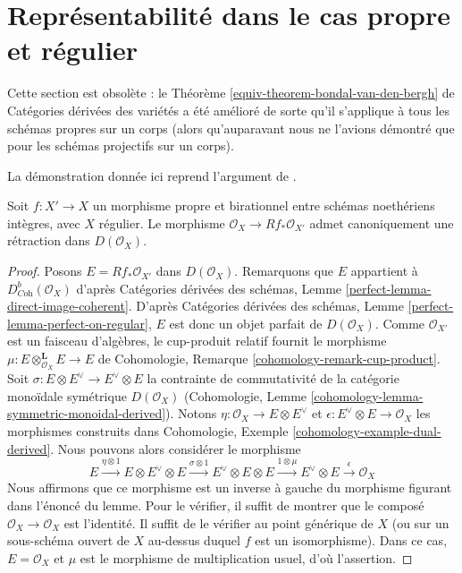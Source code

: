 \section{Représentabilité dans le cas propre et régulier}
\label{section-regular-proper}

\noindent
Cette section est obsolète : le Théorème
\ref{equiv-theorem-bondal-van-den-bergh} de Catégories dérivées des variétés
a été amélioré de sorte qu'il s'applique à tous les schémas propres sur un
corps (alors qu'auparavant nous ne l'avions démontré que pour les schémas
projectifs sur un corps).

\begin{lemma}
\label{lemma-trace-map}
\begin{reference}
La démonstration donnée ici reprend l'argument de
\cite[remarque 3.4]{MS}.
\end{reference}
Soit $f : X' \to X$ un morphisme propre et birationnel entre schémas
noethériens intègres, avec $X$ régulier. Le morphisme
$\mathcal{O}_X \to Rf_*\mathcal{O}_{X'}$ admet canoniquement une rétraction
dans $D(\mathcal{O}_X)$.
\end{lemma}

\begin{proof}
Posons $E = Rf_*\mathcal{O}_{X'}$ dans $D(\mathcal{O}_X)$.
Remarquons que $E$ appartient à
$D^b_{\textit{Coh}}(\mathcal{O}_X)$ d'après
Catégories dérivées des schémas, Lemme
\ref{perfect-lemma-direct-image-coherent}.
D'après Catégories dérivées des schémas, Lemme
\ref{perfect-lemma-perfect-on-regular}, $E$ est donc un objet parfait de
$D(\mathcal{O}_X)$. Comme $\mathcal{O}_{X'}$ est un faisceau d'algèbres,
le cup-produit relatif fournit le morphisme
$\mu : E \otimes_{\mathcal{O}_X}^\mathbf{L} E \to E$ de Cohomologie,
Remarque \ref{cohomology-remark-cup-product}.
Soit $\sigma : E \otimes E^\vee \to E^\vee \otimes E$ la contrainte de
commutativité de la catégorie monoïdale symétrique $D(\mathcal{O}_X)$
(Cohomologie, Lemme \ref{cohomology-lemma-symmetric-monoidal-derived}).
Notons $\eta : \mathcal{O}_X \to E \otimes E^\vee$ et
$\epsilon : E^\vee \otimes E \to \mathcal{O}_X$ les morphismes
construits dans Cohomologie, Exemple \ref{cohomology-example-dual-derived}.
Nous pouvons alors considérer le morphisme
$$
E \xrightarrow{\eta \otimes 1} E \otimes E^\vee \otimes E
\xrightarrow{\sigma \otimes 1} E^\vee \otimes E \otimes E
\xrightarrow{1 \otimes \mu} E^\vee \otimes E
\xrightarrow{\epsilon} \mathcal{O}_X
$$
Nous affirmons que ce morphisme est un inverse à gauche du morphisme figurant
dans l'énoncé du lemme. Pour le vérifier, il suffit de montrer que le composé
$\mathcal{O}_X \to \mathcal{O}_X$ est l'identité. Il suffit de le vérifier au
point générique de $X$ (ou sur un sous-schéma ouvert de $X$ au-dessus duquel
$f$ est un isomorphisme). Dans ce cas, $E = \mathcal{O}_X$ et $\mu$ est le
morphisme de multiplication usuel, d'où l'assertion.
\end{proof}

